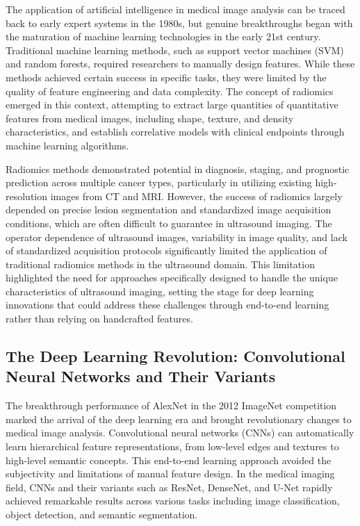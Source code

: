 The application of artificial intelligence in medical image analysis can be traced back to early expert systems in the 1980s, but genuine breakthroughs began with the maturation of machine learning technologies in the early 21st century. Traditional machine learning methods, such as support vector machines (SVM) and random forests, required researchers to manually design features. While these methods achieved certain success in specific tasks, they were limited by the quality of feature engineering and data complexity. The concept of radiomics emerged in this context, attempting to extract large quantities of quantitative features from medical images, including shape, texture, and density characteristics, and establish correlative models with clinical endpoints through machine learning algorithms.

Radiomics methods demonstrated potential in diagnosis, staging, and prognostic prediction across multiple cancer types, particularly in utilizing existing high-resolution images from CT and MRI. However, the success of radiomics largely depended on precise lesion segmentation and standardized image acquisition conditions, which are often difficult to guarantee in ultrasound imaging. The operator dependence of ultrasound images, variability in image quality, and lack of standardized acquisition protocols significantly limited the application of traditional radiomics methods in the ultrasound domain. This limitation highlighted the need for approaches specifically designed to handle the unique characteristics of ultrasound imaging, setting the stage for deep learning innovations that could address these challenges through end-to-end learning rather than relying on handcrafted features.

\subsection{The Deep Learning Revolution: Convolutional Neural Networks and Their Variants}

The breakthrough performance of AlexNet in the 2012 ImageNet competition marked the arrival of the deep learning era and brought revolutionary changes to medical image analysis. Convolutional neural networks (CNNs) can automatically learn hierarchical feature representations, from low-level edges and textures to high-level semantic concepts. This end-to-end learning approach avoided the subjectivity and limitations of manual feature design. In the medical imaging field, CNNs and their variants such as ResNet, DenseNet, and U-Net rapidly achieved remarkable results across various tasks including image classification, object detection, and semantic segmentation.

